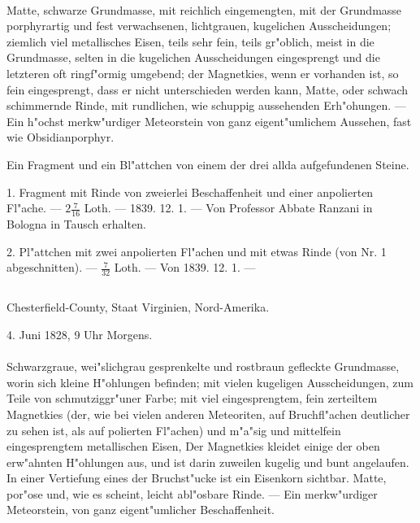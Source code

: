 \documentclass[a4paper, 11pt, oneside, polutonikogreek, german]{article}
\begin{document}
\paragraph{}
Matte, schwarze Grundmasse, mit reichlich eingemengten, mit der Grundmasse porphyrartig und fest verwachsenen, lichtgrauen, kugelichen Ausscheidungen; ziemlich viel metallisches Eisen, teils sehr fein, teils gr"oblich, meist in die Grundmasse, selten in die kugelichen Ausscheidungen eingesprengt und die letzteren oft ringf"ormig umgebend; der Magnetkies, wenn er vorhanden ist, so fein eingesprengt, dass er nicht unterschieden werden kann, Matte, oder schwach schimmernde Rinde, mit rundlichen, wie schuppig aussehenden Erh"ohungen. --- Ein h"ochst merkw"urdiger Meteorstein von ganz eigent"umlichem Aussehen, fast wie Obsidianporphyr.

Ein Fragment und ein Bl"attchen von einem der drei allda aufgefundenen Steine.

1. Fragment mit Rinde von zweierlei Beschaffenheit und einer anpolierten Fl"ache. --- $\mathfrak{2\frac{7}{16}}$ Loth. --- 1839. 12. 1. --- Von Professor Abbate Ranzani in Bologna in Tausch erhalten.

2. Pl"attchen mit zwei anpolierten Fl"achen und mit etwas Rinde (von Nr. 1 abgeschnitten). --- $\mathfrak{\frac{7}{32}}$ Loth. --- Von 1839. 12. 1. ---
\subsection{}
\begin{center}

Chesterfield-County, Staat Virginien, Nord-Amerika.

4. Juni 1828, 9 Uhr Morgens.
\end{center}
\paragraph{}
Schwarzgraue, wei"slichgrau gesprenkelte und rostbraun gefleckte Grundmasse, worin sich kleine H"ohlungen befinden; mit vielen kugeligen Ausscheidungen, zum Teile von schmutziggr"uner Farbe; mit viel eingesprengtem, fein zerteiltem Magnetkies (der, wie bei vielen anderen Meteoriten, auf Bruchfl"achen deutlicher zu sehen ist, als auf polierten Fl"achen) und m"a"sig und mittelfein eingesprengtem metallischen Eisen, Der Magnetkies kleidet einige der oben erw"ahnten H"ohlungen aus, und ist darin zuweilen kugelig und bunt angelaufen. In einer Vertiefung eines der Bruchst"ucke ist ein Eisenkorn sichtbar. Matte, por"ose und, wie es scheint, leicht abl"osbare Rinde. --- Ein merkw"urdiger Meteorstein, von ganz eigent"umlicher Beschaffenheit.
\end{document}

